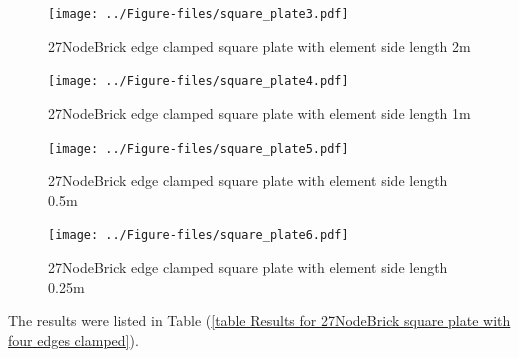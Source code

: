 \documentclass[fleqn,11pt]{article}
\begin{document}
\begin{figure}[H]
  \centering
  \texttt{[image: ../Figure-files/square\_plate3.pdf]}
  \caption{27NodeBrick edge clamped square plate with element side length 2m }
  \label{fig 27NodeBrick edges clamped square plate with element side length 2m }
\end{figure}

\newpage

\begin{figure}[H]
  \centering
  \texttt{[image: ../Figure-files/square\_plate4.pdf]}
  \caption{27NodeBrick edge clamped square plate with element side length 1m }
  \label{fig 27NodeBrick edges clamped square plate with element side length 1m }
\end{figure}


\begin{figure}[H]
  \centering
  \texttt{[image: ../Figure-files/square\_plate5.pdf]}
  \caption{27NodeBrick edge clamped square plate with element side length 0.5m }
  \label{fig 27NodeBrick edges clamped square plate with element side length 0.5m }
\end{figure}

\newpage

\begin{figure}[H]
  \centering
  \texttt{[image: ../Figure-files/square\_plate6.pdf]}
  \caption{27NodeBrick edge clamped square plate with element side length 0.25m }
  \label{fig 27NodeBrick edges clamped square plate with element side length 0.25m }
\end{figure}



The results were listed in Table (\ref{table Results for 27NodeBrick square plate with four edges clamped}).
\end{document}
